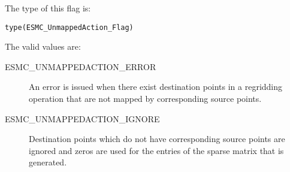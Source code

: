 The type of this flag is:

{\tt type(ESMC\_UnmappedAction\_Flag)}

The valid values are:
\begin{description}
	\item[ESMC\_UNMAPPEDACTION\_ERROR]
	An error is issued when there exist destination points in a regridding
	operation that are not mapped by corresponding source points.
	\item[ESMC\_UNMAPPEDACTION\_IGNORE]
	Destination points which do not have corresponding source points are 
	ignored and zeros are used for the entries of the sparse matrix
	that is generated.
\end{description}


